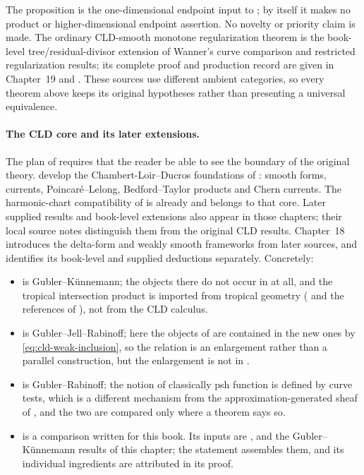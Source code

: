 The proposition is the one-dimensional endpoint input to
; by itself it makes no
product or higher-dimensional endpoint assertion.
No novelty or priority claim is made.
The ordinary CLD-smooth monotone regularization theorem
 is the book-level
tree/residual-divisor extension of Wanner's curve comparison and restricted
regularization results; its complete proof and production record are given
in Chapter~19 and .
These sources use different ambient categories, so every theorem above keeps
its original hypotheses rather than presenting a universal equivalence.

\paragraph{The CLD core and its later extensions.}
\label{sec:appM-core-boundary}
The plan of  requires that the reader be able to see the
boundary of the original theory.
 develop the
Chambert-Loir--Ducros foundations of \cite{CLD25}: smooth forms, currents,
Poincar\'e--Lelong, Bedford--Taylor products and Chern currents.  The
harmonic-chart compatibility of  is already
\cite[\S7.8]{CLD25} and belongs to that core.  Later supplied results and
book-level extensions also appear in those chapters; their local source
notes distinguish them from the original CLD results.  Chapter~18
introduces the delta-form and weakly smooth frameworks from later sources,
and identifies its book-level and supplied deductions separately.
Concretely:
\begin{itemize}
\item {} is
 Gubler--K\"unnemann; the objects there do not occur in \cite{CLD25} at all,
 and the tropical intersection product is imported from tropical geometry
 (\cite{MR18Tropical} and the references of ),
 not from the CLD calculus.
\item {} is
 Gubler--Jell--Rabinoff; here the objects of \cite{CLD25} are contained in
 the new ones by \eqref{eq:cld-weak-inclusion}, so the relation is an
 enlargement rather than a parallel construction, but the enlargement is not
 in \cite{CLD25}.
\item {} is Gubler--Rabinoff; the notion of
 classically psh function is defined by curve tests, which is a different
 mechanism from the approximation-generated sheaf of \cite{CLD25}, and the
 two are compared only where a theorem says so.
\item {} is a comparison written for this
 book.  Its inputs are ,  and the
 Gubler--K\"unnemann results of this chapter; the statement
  assembles them, and its individual
 ingredients are attributed in its proof.
\end{itemize}

